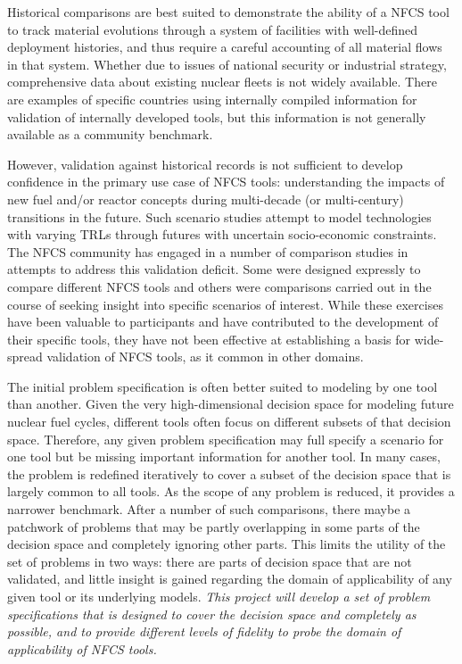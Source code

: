 Historical comparisons are best suited to demonstrate the ability of a
\gls{NFCS} tool to track material evolutions through a system of facilities
with well-defined deployment histories, and thus require a careful accounting
of all material flows in that system.  Whether due to issues of national
security or industrial strategy, comprehensive data about existing nuclear
fleets is not widely available.  There are examples of specific countries
using internally compiled information for validation of internally developed
tools\cite{COSI6 - Coquelet}, but this information is not generally available
as a community benchmark.

However, validation against historical records is not sufficient to develop
confidence in the primary use case of \gls{NFCS} tools: understanding the
impacts of new fuel and/or reactor concepts during multi-decade (or
multi-century) transitions in the future.  Such scenario studies attempt to
model technologies with varying \glspl{TRL} through futures with uncertain
socio-economic constraints.  The \gls{NFCS} community has engaged in a number
of comparison studies in attempts to address this validation deficit\cite{IAEA
  - Benchmark Study on Nuclear Fuel Cycle Transition Scenarios, MIT -
  Guerin,Standardized verification of fuel cycle modeling -
  B.Feng,some,previous,comparison,studies}. Some were designed expressly to
compare different \gls{NFCS} tools and others were comparisons carried out in
the course of seeking insight into specific scenarios of interest. While these
exercises have been valuable to participants and have contributed to the
development of their specific tools, they have not been effective at
establishing a basis for wide-spread validation of \gls{NFCS} tools, as it
common in other domains.

The initial problem specification is often better suited to modeling by one
tool than another.  Given the very high-dimensional decision space for
modeling future nuclear fuel cycles, different tools often focus on different
subsets of that decision space.  Therefore, any given problem specification
may full specify a scenario for one tool but be missing important information
for another tool.  In many cases, the problem is redefined iteratively to
cover a subset of the decision space that is largely common to all tools.  As
the scope of any problem is reduced, it provides a narrower benchmark.  After
a number of such comparisons, there maybe a patchwork of problems that may be
partly overlapping in some parts of the decision space and completely ignoring
other parts.  This limits the utility of the set of problems in two ways:
there are parts of decision space that are not validated, and little insight
is gained regarding the domain of applicability of any given tool or its
underlying models. \emph{This project will develop a set of problem
  specifications that is designed to cover the decision space and completely
  as possible, and to provide different levels of fidelity to probe the domain
  of applicability of \gls{NFCS} tools.}

